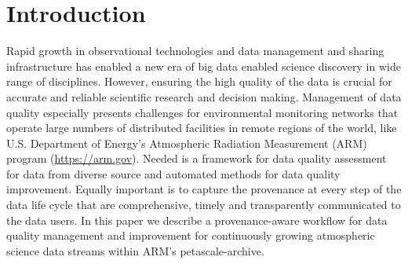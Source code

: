 \section{Introduction}
Rapid growth in observational technologies and data management and
sharing infrastructure has enabled a new era of big data enabled science
discovery in wide range of disciplines. However, ensuring the high
quality of the data is crucial for accurate and reliable scientific
research and decision making. Management of data quality especially
presents challenges for environmental monitoring networks that operate
large numbers of distributed facilities in remote regions of the world,
like U.S. Department of Energy's Atmospheric Radiation Measurement (ARM)
program (\url{https://arm.gov}). Needed is a framework for data quality 
assessment for data from diverse source and automated methods for data
quality improvement. Equally important is to capture the provenance at
every step of
the data life cycle that are comprehensive, timely and transparently
communicated to the data users.
In this paper we describe a provenance-aware workflow for
data quality management and improvement for continuously growing
atmospheric science data streams within ARM's petascale-archive.


